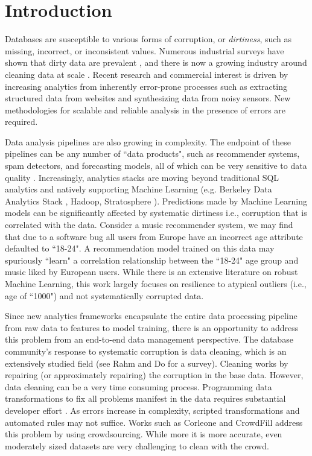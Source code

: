\section{Introduction}
Databases are susceptible to various forms of corruption, or \emph{dirtiness}, such as missing, incorrect, or inconsistent values.
Numerous industrial surveys have shown that dirty data are prevalent \cite{Gartner}, and there is now a growing industry around cleaning data at scale \cite{fortunearticle}.
Recent research and commercial interest is driven by increasing analytics from inherently error-prone processes such as extracting structured data from websites and synthesizing data from noisy sensors.
New methodologies for scalable and reliable analysis in the presence of errors are required. 

Data analysis pipelines are also growing in complexity.
The endpoint of these pipelines can be any number of ``data products", such as recommender systems, spam detectors, and forecasting models, all of which can be very sensitive to data quality \cite{xiaofeature}.
Increasingly, analytics stacks are moving beyond traditional SQL analytics and natively supporting Machine Learning (e.g. Berkeley Data Analytics Stack \cite{bdas}, Hadoop, Stratosphere \cite{alexandrov2014stratosphere}).
Predictions made by Machine Learning models can be significantly affected by systematic dirtiness i.e., corruption that is correlated with the data.
Consider a music recommender system, we may find that due to a software bug all users from Europe have an incorrect age attribute defaulted to ``18-24".
A recommendation model trained on this data may spuriously ``learn" a correlation relationship between the ``18-24" age group and music liked by European users.
While there is an extensive literature on robust Machine Learning, this work largely focuses on resilience to atypical outliers (i.e., age of ``1000") and not systematically corrupted data.

Since new analytics frameworks encapsulate the entire data processing pipeline from raw data to features to model training, there is an opportunity to address this problem from an end-to-end data management perspective.  
The database community's response to systematic corruption is data cleaning, which is an extensively studied field (see Rahm and Do \cite{rahm2000data} for a survey).
Cleaning works by repairing (or approximately repairing) the corruption in the base data.
However, data cleaning can be a very time consuming process.
Programming data transformations to fix all problems manifest in the data requires substantial developer effort \cite{kandel2012}.
As errors increase in complexity, scripted transformations and automated rules may not suffice. 
Works such as Corleone\cite{gokhale2014corleone} and CrowdFill\cite{park2014crowdfill} address this problem by using crowdsourcing.
While more it is more accurate, even moderately sized datasets are very challenging to clean with the crowd.


